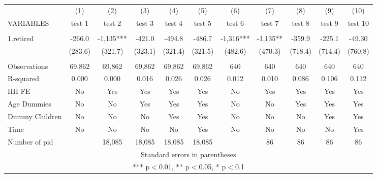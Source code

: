 \begin{tabular}{lcccccccccc} \hline
 & (1) & (2) & (3) & (4) & (5) & (6) & (7) & (8) & (9) & (10) \\
VARIABLES & test 1 & test 2 & test 3 & test 4 & test 5 & test 6 & test 7 & test 8 & test 9 & test 10 \\ \hline
 &  &  &  &  &  &  &  &  &  &  \\
1.retired & -266.0 & -1,135*** & -421.0 & -494.8 & -486.7 & -1,316*** & -1,135** & -359.9 & -225.1 & -49.30 \\
 & (283.6) & (321.7) & (323.1) & (321.4) & (321.5) & (482.6) & (470.3) & (718.4) & (714.4) & (760.8) \\
 &  &  &  &  &  &  &  &  &  &  \\
Observations & 69,862 & 69,862 & 69,862 & 69,862 & 69,862 & 640 & 640 & 640 & 640 & 640 \\
R-squared & 0.000 & 0.000 & 0.016 & 0.026 & 0.026 & 0.012 & 0.010 & 0.086 & 0.106 & 0.112 \\
HH FE & No & Yes & Yes & Yes & Yes & No & Yes & Yes & Yes & Yes \\
Age Dummies & No & No & Yes & Yes & Yes & No & No & Yes & Yes & Yes \\
Dummy Children & No & No & No & Yes & Yes & No & No & No & Yes & Yes \\
Time & No & No & No & No & Yes & No & No & No & No & Yes \\
 Number of pid &  & 18,085 & 18,085 & 18,085 & 18,085 &  & 86 & 86 & 86 & 86 \\ \hline
\multicolumn{11}{c}{ Standard errors in parentheses} \\
\multicolumn{11}{c}{ *** p$<$0.01, ** p$<$0.05, * p$<$0.1} \\
\end{tabular}
